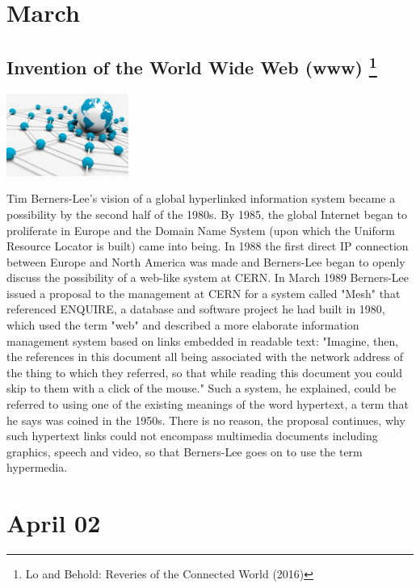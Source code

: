 \documentclass[11pt]{report}
\begin{document}
\section{March}
\subsection{Invention of the World Wide Web (www) \protect\footnote{Lo and Behold: Reveries of the Connected World (2016)}}
\vspace{2mm}\begin{center}\includegraphics[width=4cm]{./img/www.jpg}\end{center}
Tim Berners-Lee's vision of a global hyperlinked information system became a possibility by the second half of the 1980s. By 1985, the global Internet began to proliferate in Europe and the Domain Name System (upon which the Uniform Resource Locator is built) came into being. In 1988 the first direct IP connection between Europe and North America was made and Berners-Lee began to openly discuss the possibility of a web-like system at CERN. In March 1989 Berners-Lee issued a proposal to the management at CERN for a system called "Mesh" that referenced ENQUIRE, a database and software project he had built in 1980, which used the term "web" and described a more elaborate information management system based on links embedded in readable text: "Imagine, then, the references in this document all being associated with the network address of the thing to which they referred, so that while reading this document you could skip to them with a click of the mouse." Such a system, he explained, could be referred to using one of the existing meanings of the word hypertext, a term that he says was coined in the 1950s. There is no reason, the proposal continues, why such hypertext links could not encompass multimedia documents including graphics, speech and video, so that Berners-Lee goes on to use the term hypermedia.
\section{April 02}
\end{document}
